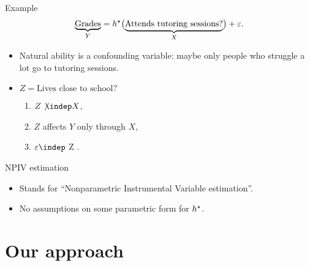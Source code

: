 \documentclass[aspectratio=169]{beamer}
\begin{document}
    \begin{frame}{Example}
        \begin{equation*}
            \underbrace{\text{Grades}}_{Y} = h^{ \star } \bigl( \underbrace{ \text{Attends tutoring sessions?} }_{X} \bigr) + \varepsilon
        .\end{equation*}
        \begin{itemize}
            \item<2-> Natural ability is a confounding variable: maybe only people who struggle a lot go to tutoring sessions.
            \item<3-> $ Z = \text{Lives close to school?} $
                \begin{enumerate}
                    \item<4-> $ Z \not\kern-1pt\indep X $,
                    \item<4-> $ Z $ affects $ Y $ only through $ X $, 
                    \item<4-> $ \varepsilon \indep $ Z $ $.
                \end{enumerate}
        \end{itemize}
    \end{frame}

    \begin{frame}{NPIV estimation}
        \begin{itemize}
            \item<1-> Stands for ``Nonparametric Instrumental Variable estimation''.
            \item<2-> No assumptions on some parametric form for $ h^{ \star } $.
        \end{itemize}
    \end{frame}

    \section{Our approach}

\end{document}
